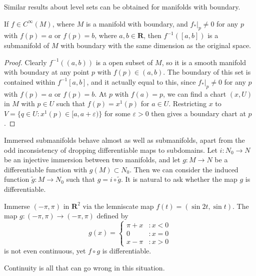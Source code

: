 Similar results about level sets can be obtained for manifolds with boundary.

\begin{theorem}
    If $f \in C^\infty(M)$, where $M$ is a manifold with boundary, and $f_*|_p \neq 0$ for any $p$ with $f(p) = a$ or $f(p) = b$, where $a,b \in \mathbf{R}$, then $f^{-1}([a,b])$ is a submanifold of $M$ with boundary with the same dimension as the original space.
\end{theorem}
\begin{proof}
    Clearly $f^{-1}((a,b))$ is a open subset of $M$, so it is a smooth manifold with boundary at any point $p$ with $f(p) \in (a,b)$. The boundary of this set is contained within $f^{-1}[a,b]$, and it actually equal to this, since $f_*|_p \neq 0$ for any $p$ with $f(p) = a$ or $f(p) = b$. At $p$ with $f(a) = p$, we can find a chart $(x,U)$ in $M$ with $p \in U$ such that $f(p) = x^1(p)$ for $a \in U$. Restricting $x$ to $V = \{ q \in U : x^1(p) \in [a,a+\varepsilon) \}$ for some $\varepsilon > 0$ then gives a boundary chart at $p$.
\end{proof}

Immersed submanifolds behave almost as well as submanifolds, apart from the odd inconsistency of dropping differentiable maps to subdomains. Let $i: N_0 \to N$ be an injective immersion between two manifolds, and let $g: M \to N$ be a differentiable function with $g(M) \subset N_0$. Then we can consider the induced function $\tilde{g}: M \to N_0$ such that $g = i \circ \tilde{g}$. It is natural to ask whether the map $g$ is differentiable.

\begin{example}
    Immerse $(-\pi, \pi)$ in $\mathbf{R}^2$ via the lemniscate map $f(t) = (\sin 2t, \sin t)$. The map $g:(-\pi, \pi) \to (-\pi, \pi)$ defined by
    \[ g(x) = \begin{cases} \pi + x &: x < 0 \\ 0 &: x = 0 \\ x - \pi &: x > 0 \end{cases} \]
    is not even continuous, yet $f \circ g$ is differentiable.
\end{example}

Continuity is all that can go wrong in this situation.

